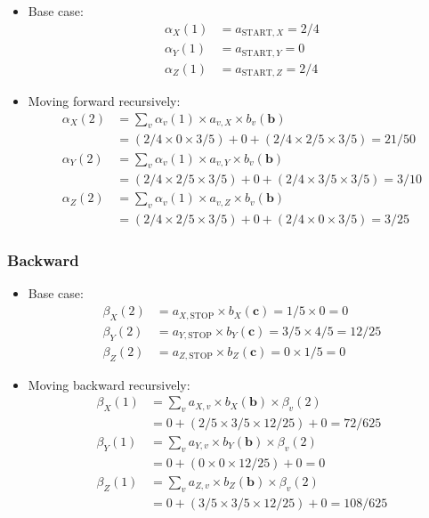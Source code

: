 \documentclass[11pt,fancychapters]{article}
\begin{document}
\begin{itemize}
	\item Base case:
	\begin{align*}
		\alpha_X(1) &= a_{\text{START}, X} = 2/4 \\
		\alpha_Y(1) &= a_{\text{START}, Y} = 0 \\
		\alpha_Z(1) &= a_{\text{START}, Z} = 2/4
	\end{align*}
	
	\item Moving forward recursively:
	\begin{align*}
		\alpha_X(2) &= \sum_v \alpha_v(1) \times a_{v, X} \times b_v(\textbf{b}) \\
		&= (2/4 \times 0 \times 3/5) + 0 + (2/4 \times 2/5 \times 3/5) = 21/50 \\
		\alpha_Y(2) &= \sum_v \alpha_v(1) \times a_{v, Y} \times b_v(\textbf{b}) \\
		& = (2/4 \times 2/5 \times 3/5) + 0 + (2/4 \times 3/5 \times 3/5) = 3/10 \\
		\alpha_Z(2) &= \sum_v \alpha_v(1) \times a_{v, Z} \times b_v(\textbf{b}) \\
		& = (2/4 \times 2/5 \times 3/5) + 0 + (2/4 \times 0 \times 3/5) = 3/25
	\end{align*}
\end{itemize}

\subsubsection*{Backward}

\begin{itemize}
	\item Base case:
	\begin{align*}
		\beta_X(2) &= a_{X, \text{STOP}} \times b_X(\textbf{c}) = 1/5 \times 0 = 0 \\
		\beta_Y(2) &= a_{Y, \text{STOP}} \times b_Y(\textbf{c}) = 3/5 \times 4/5 = 12/25 \\
		\beta_Z(2) &= a_{Z, \text{STOP}} \times b_Z(\textbf{c}) = 0 \times 1/5 = 0
	\end{align*}
	
	\item Moving backward recursively:
	\begin{align*}
		\beta_X(1) &= \sum_v a_{X, v} \times b_X(\textbf{b}) \times \beta_v(2) \\
		&= 0 + (2/5 \times 3/5 \times 12/25) + 0 = 72/625 \\
		\beta_Y(1) &= \sum_v a_{Y, v} \times b_Y(\textbf{b}) \times \beta_v(2) \\
		&= 0 + (0 \times 0 \times 12/25) + 0 = 0 \\
		\beta_Z(1) &= \sum_v a_{Z, v} \times b_Z(\textbf{b}) \times \beta_v(2) \\
		&= 0 + (3/5 \times 3/5 \times 12/25) + 0 = 108/625
	\end{align*}
\end{itemize}
\end{document}
